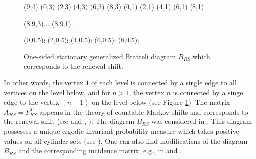 \documentclass[11pt, twoside]{amsart}
\theoremstyle{definition}
\theoremstyle{remark}
\theoremstyle{plain}
\numberwithin{equation}{section}
\begin{document}
\begin{figure}[hbt!]
\unitlength=1cm
\begin{graph}(9,4)
   (0,3)
 (2,3)
 (4,3)
 (6,3)
  (8,3)
 (0,1)
 (2,1)
 (4,1)
  (6,1)
    (8,1)
  



    

      
     

    

   

    
    
 \freetext(8.9,3){$\ldots$}
  \freetext(8.9,1){$\ldots$}
  
  \freetext(0,0.5){$\vdots$}
  \freetext(2,0.5){$\vdots$}
    \freetext(4,0.5){$\vdots$}
      \freetext(6,0.5){$\vdots$}  
        \freetext(8,0.5){$\vdots$} 


\end{graph}
\caption{One-sided stationary generalized Bratteli diagram $B_{RS}$ which corresponds to the renewal shift.}\label{Fig:BDrenewal}
\end{figure}


In other words, the vertex $1$ of each level is connected by a single edge to all vertices on the level below, and for $n > 1$, the vertex $n$ is connected by a singe edge to the vertex $(n-1)$ on the level below (see Figure \ref{Fig:BDrenewal}). 
The matrix $A_{RS} = F_{RS}^T$ appears in the theory of countable Markov shifts and corresponds to the renewal shift (see \cite[Chapter 7]{Kitchens1998} and \cite[Subsection 4.3.1]{Raszeja2021}, \cite[Subsection 3.2]{BEFR2022}). 
The diagram $B_{RS}$ was considered in \cite[Example 7.16]{BezuglyiJorgensenKarpelSanadhya2025}.
This diagram possesses a unique ergodic invariant probability measure which takes positive values on all cylinder sets (see \cite[Theorem 7.2, Proposition 7.17]{BezuglyiJorgensenKarpelSanadhya2025}). One can also find modifications of the diagram $B_{RS}$ and the corresponding incidence matrix, e.g., in \cite[Subection 7.3]{BezuglyiJorgensenKarpelSanadhya2025} and \cite[Subection 4.3]{Raszeja2021}.
\end{document}
